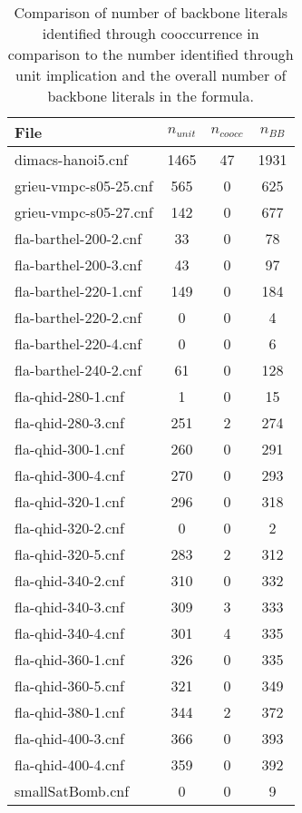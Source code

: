\begin{wraptable}[31]{l}{8cm}
\begin{tabular}{l| c c c }
File& $n_{unit}$ & $n_{coocc}$ & $n_{BB}$\\
\hline
dimacs-hanoi5.cnf & 1465 & 47 & 1931 \\
grieu-vmpc-s05-25.cnf & 565 & 0 & 625 \\
grieu-vmpc-s05-27.cnf & 142 & 0 & 677 \\
fla-barthel-200-2.cnf & 33 & 0 & 78 \\
fla-barthel-200-3.cnf & 43 & 0 & 97 \\
fla-barthel-220-1.cnf & 149 & 0 & 184 \\
fla-barthel-220-2.cnf & 0 & 0 & 4 \\
fla-barthel-220-4.cnf & 0 & 0 & 6 \\
fla-barthel-240-2.cnf & 61 & 0 & 128 \\
fla-qhid-280-1.cnf & 1 & 0 & 15 \\
fla-qhid-280-3.cnf & 251 & 2 & 274 \\
fla-qhid-300-1.cnf & 260 & 0 & 291 \\
fla-qhid-300-4.cnf & 270 & 0 & 293 \\
fla-qhid-320-1.cnf & 296 & 0 & 318 \\
fla-qhid-320-2.cnf & 0 & 0 & 2 \\
fla-qhid-320-5.cnf & 283 & 2 & 312 \\
fla-qhid-340-2.cnf & 310 & 0 & 332 \\
fla-qhid-340-3.cnf & 309 & 3 & 333 \\
fla-qhid-340-4.cnf & 301 & 4 & 335 \\
fla-qhid-360-1.cnf & 326 & 0 & 335 \\
fla-qhid-360-5.cnf & 321 & 0 & 349 \\
fla-qhid-380-1.cnf & 344 & 2 & 372 \\
fla-qhid-400-3.cnf & 366 & 0 & 393 \\
fla-qhid-400-4.cnf & 359 & 0 & 392 \\
smallSatBomb.cnf & 0 & 0 & 9 \\
\end{tabular}
\caption{Comparison of number of backbone literals identified through cooccurrence in comparison to the number identified through unit implication and the overall number of backbone literals in the formula.}
\label{tab:coocBB}
\end{wraptable}

